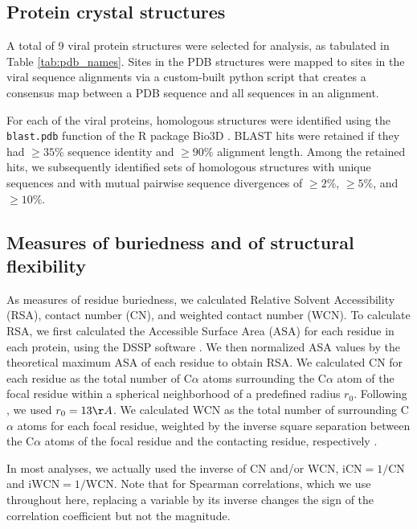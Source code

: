 \documentclass[smallextended]{svjour3}
\begin{document}
\subsection*{Protein crystal structures}

A total of 9 viral protein structures were selected for analysis, as tabulated in Table \ref{tab:pdb_names}. Sites in the PDB structures were mapped to sites in the viral sequence alignments via a custom-built python script that creates a consensus map between a PDB sequence and all sequences in an alignment.

For each of the viral proteins, homologous structures were identified using the \texttt{blast.pdb} function of the R package Bio3D \citep{Grantetal2006}. BLAST hits were retained if they had $\geq35$\% sequence identity and $\geq90$\% alignment length. Among the retained hits, we subsequently identified sets of homologous structures with unique sequences and with mutual pairwise sequence divergences of $\geq2\%$, $\geq5\%$, and $\geq10\%$.

\subsection*{Measures of buriedness and of structural flexibility}

As measures of residue buriedness, we calculated Relative Solvent Accessibility (RSA), contact number (CN), and weighted contact number (WCN). To calculate RSA, we first calculated the Accessible Surface Area (ASA) for each residue in each protein, using the DSSP software \citep{KabschSander1983}. We then normalized ASA values by the theoretical maximum ASA of each residue \citep{Tienetal2013} to obtain RSA. We calculated CN for each residue as the total number of C$\alpha$ atoms surrounding the  C$\alpha$ atom of the focal residue within a spherical neighborhood of a predefined radius $r_0$. Following \citet{Yehetal2014}, we used $r_0=13\AA$. We calculated WCN as the total number of surrounding C$\alpha$ atoms for each focal residue, weighted by the inverse square separation between the C$\alpha$ atoms of the focal residue and the contacting residue, respectively \citep{Shihetal2012}.

In most analyses, we actually used the inverse of CN and/or WCN, $\text{iCN}=1/\text{CN}$ and $\text{iWCN}=1/\text{WCN}$. Note that for Spearman correlations, which we use throughout here, replacing a variable by its inverse changes the sign of the correlation coefficient but not the magnitude.
\end{document}
